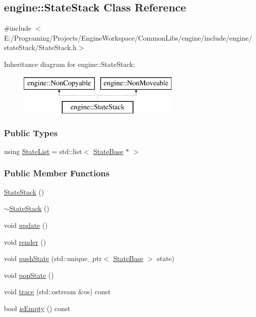 \hypertarget{a00073}{}\subsection{engine\+:\+:State\+Stack Class Reference}
\label{a00073}


{\ttfamily \#include $<$E\+:/\+Programing/\+Projects/\+Engine\+Workspace/\+Common\+Libs/engine/include/engine/state\+Stack/\+State\+Stack.\+h$>$}

Inheritance diagram for engine\+:\+:State\+Stack\+:\begin{figure}[H]
\begin{center}
\leavevmode
\includegraphics[height=2.000000cm]{a00073}
\end{center}
\end{figure}
\subsubsection*{Public Types}
\begin{DoxyCompactItemize}
\item 
using \hyperlink{a00073_a866f3ce726d328dc3488f3300b94be07}{State\+List} = std\+::list$<$ \hyperlink{a00072}{State\+Base} $\ast$ $>$
\end{DoxyCompactItemize}
\subsubsection*{Public Member Functions}
\begin{DoxyCompactItemize}
\item 
\hyperlink{a00073_af80814eae37384bbbf07f3c041ff9489}{State\+Stack} ()
\item 
\hyperlink{a00073_a1c5c62604825cc9e4395212cd2986829}{$\sim$\+State\+Stack} ()
\item 
void \hyperlink{a00073_a129b751979654c033dfbb5595519db48}{update} ()
\item 
void \hyperlink{a00073_a948f666845a6bbebc6f629a3eef8de0b}{render} ()
\item 
void \hyperlink{a00073_aae3b3caef3cf8dfd7ba9ea0232b5babd}{push\+State} (std\+::unique\+\_\+ptr$<$ \hyperlink{a00072}{State\+Base} $>$ state)
\item 
void \hyperlink{a00073_ad4332c156e0169fcde04044acb59928d}{pop\+State} ()
\item 
void \hyperlink{a00073_a7d05f3d0f8ca93a48911bb14558314d4}{trace} (std\+::ostream \&os) const 
\item 
bool \hyperlink{a00073_a07e9947e97bb7e5ad5533d68f0791429}{is\+Empty} () const 
\end{DoxyCompactItemize}


